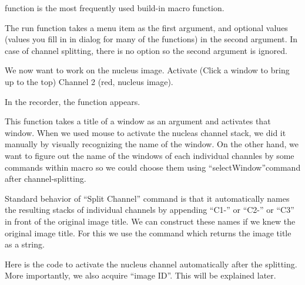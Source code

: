  function is the most frequently used build-in macro function.
\setlength{\fboxrule}{5pt}


The run function takes a menu item as the first argument, and optional values (values you fill in in dialog for many of the functions) in the second argument. In case of channel splitting, there is no option so the second argument is ignored.

We now want to work on the nucleus image. Activate (Click a window to bring up to the top) Channel 2 (red, nucleus image).

In the recorder, the function  appears.


This function takes a title of a window as an argument and activates that window. When we used mouse to activate the nucleas channel stack, we did it manually by visually recognizing the name of the window. On the other hand, we want to figure out the name of the windows of each individual channles by some commands within macro so we could choose them using ``selectWindow''command after channel-splitting.

Standard behavior of ``Split Channel'' command is that it automatically names the resulting stacks of individual channels by appending ``C1-'' or ``C2-'' or ``C3'' in front of the original image title. We can construct these names if we knew the original image title. For this we use the command  which returns the image title as a string.


Here is the code to activate the nucleus channel automatically after the splitting. More importantly, we also acquire ``image ID''. This will be explained later.